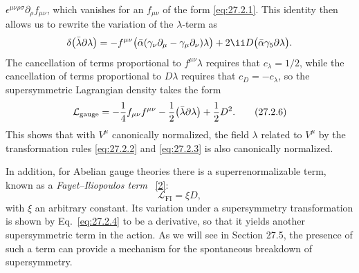\(\epsilon^{\mu\nu\rho\sigma}\partial_\rho f_{\mu\nu}\), which vanishes
for an \(f_{\mu\nu}\) of the form \eqref{eq:27.2.1}. This identity then
allows us to rewrite the variation of the \(\lambda\)-term as
\[
  \delta\bigl(\bar\lambda\sl{\partial}\lambda\bigr)
  =-f^{\mu\nu}
    \bigl(\bar\alpha(\gamma_\nu\partial_\mu
      -\gamma_\mu\partial_\nu)\lambda\bigr)
  +2\ii D\bigl(\bar\alpha\gamma_5\sl{\partial}\lambda\bigr).
\]
The cancellation of terms proportional to \(f^{\mu\nu}\lambda\) requires
that \(c_\lambda=1/2\), while the cancellation of terms proportional to
\(D\lambda\) requires that \(c_D=-c_\lambda\), so the supersymmetric
Lagrangian density takes the form
\begin{equation}
  \mathcal{L}_{\mathrm{gauge}}
  =-\frac14f_{\mu\nu}f^{\mu\nu}
  -\frac12\bigl(\bar\lambda\sl{\partial}\lambda\bigr)
  +\frac12D^2.
  \tag{27.2.6}\label{eq:27.2.6}
\end{equation}
This shows that with \(V^\mu\) canonically normalized, the field
\(\lambda\) related to \(V^\mu\) by the transformation rules
\eqref{eq:27.2.2} and \eqref{eq:27.2.3} is also canonically normalized.

In addition, for Abelian gauge theories there is a superrenormalizable
term, known as a \textit{Fayet--Iliopoulos term}%
~\hyperref[ch27-ref-2]{[2]}:
\begin{equation}
  \mathcal{L}_{\mathrm{FI}}=\xi D,
  \tag{27.2.7}\label{eq:27.2.7}
\end{equation}
with \(\xi\) an arbitrary constant. Its variation under a supersymmetry
transformation is shown by Eq.~\eqref{eq:27.2.4} to be a derivative, so
that it yields another supersymmetric term in the action. As we will see
in Section 27.5, the presence of such a term can provide a mechanism for
the spontaneous breakdown of supersymmetry.

